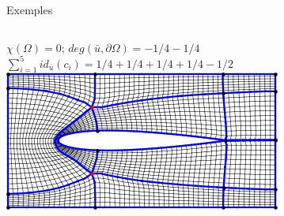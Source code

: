 \documentclass[compress,10pt,aspectratio=169]{beamer}
\begin{document}
\begin{frame}{Exemples}
\begin{columns}
\begin{column}{0.34\textwidth}
{    \scriptsize
    $\chi(\Omega)=0$; $deg(\bar{u}, \partial\Omega) = -1/4-1/4$\\\vspace{0.1cm}
    $\sum_{i=1}^{5} id_{\bar{u}}(c_i)=1/4+1/4+1/4+1/4-1/2$\\\vspace{0.1cm}\vspace{0.6cm}
    \includegraphics[scale=0.35]{images/4.png}}
\end{column}
\begin{column}{0.34\textwidth}
    \centering
\end{column}
\end{columns}
\end{frame}
\end{document}
